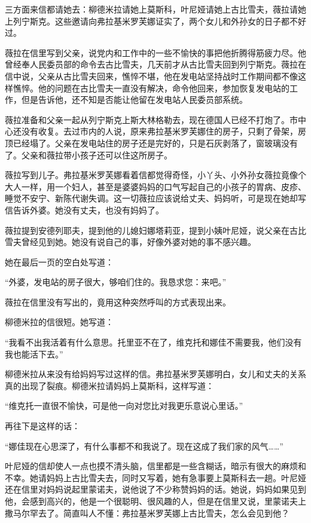 三方面来信都请她去：柳德米拉请她上莫斯科，叶尼娅请她上古比雪夫，薇拉请她上列宁斯克。这些邀请向弗拉基米罗芙娜证实了，两个女儿和外孙女的日子都不好过。

薇拉在信里写到父亲，说党内和工作中的一些不愉快的事把他折腾得筋疲力尽。他曾经奉人民委员部的命令去古比雪夫，几天前才从古比雪夫回到列宁斯克。薇拉在信中说，父亲从古比雪夫回来，憔悴不堪，他在发电站坚持战时工作期间都不像这样憔悴。他的问题在古比雪夫一直没有解决，命令他回来，参加恢复发电站的工作，但是告诉他，还不知是否能让他留在发电站人民委员部系统。

薇拉准备和父亲一起从列宁斯克上斯大林格勒去，现在德国人已经不打炮了。市中心还没有收复。去过市内的人说，原来弗拉基米罗芙娜住的房子，只剩了骨架，房顶已经塌了。父亲在发电站住的房子还是完好的，只是石灰剥落了，窗玻璃没有了。父亲和薇拉带小孩子还可以住这所房子。

薇拉写到儿子。弗拉基米罗芙娜看着信都觉得奇怪，小丫头、小外孙女薇拉竟像个大人一样，用一个妇人，甚至是婆婆妈妈的口气写起自己的小孩子的胃病、皮疹、睡觉不安宁、新陈代谢失调。这一切薇拉应该说给丈夫、妈妈听，可是现在她却写信告诉外婆。她没有丈夫，也没有妈妈了。

薇拉提到安德列耶夫，提到他的儿媳妇娜塔莉亚，提到小姨叶尼娅，说父亲在古比雪夫曾经见到她。她没有说自己的事，好像外婆对她的事不感兴趣。

她在最后一页的空白处写道：

“外婆，发电站的房子很大，够咱们住的。我恳求您：来吧。”

薇拉在信里没有写出的，竟用这种突然呼叫的方式表现出来。

柳德米拉的信很短。她写道：

“我看不出我活着有什么意思。托里亚不在了，维克托和娜佳不需要我，他们没有我也能活下去。”

柳德米拉从来没有给妈妈写过这样的信。弗拉基米罗芙娜明白，女儿和丈夫的关系真的出现了裂痕。柳德米拉请妈妈上莫斯科，这样写道：

“维克托一直很不愉快，可是他一向对您比对我更乐意说心里话。”

再往下是这样的话：

“娜佳现在心思深了，有什么事都不和我说了。现在这成了我们家的风气……”

叶尼娅的信却使人一点也摸不清头脑，信里都是一些含糊话，暗示有很大的麻烦和不幸。她请妈妈上古比雪夫去，同时又写着，她有急事要上莫斯科去一趟。叶尼娅还在信里对妈妈说起里蒙诺夫，说他说了不少称赞妈妈的话。她说，妈妈如果见到他，会感到高兴的，他是一个很聪明、很风趣的人，但是在信里又说，里蒙诺夫上撒马尔罕去了。简直叫人不懂：弗拉基米罗芙娜上古比雪夫，怎么会见到他？


